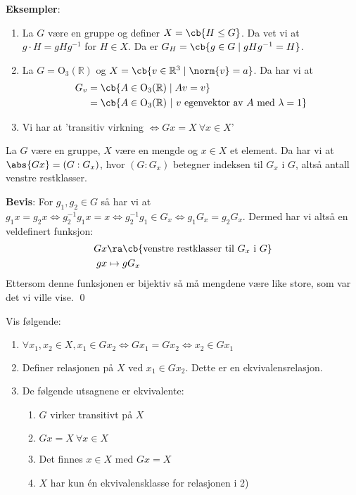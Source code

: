 \textbf{Eksempler}:
\begin{enumerate}
	\item La $G$ være en gruppe og definer $X = \cb{H \leq G}$. Da vet vi at $g\cdot H = gHg^{-1}$
	      for $H\in X$. Da er $G_H = \cb{g\in G\mid gHg^{-1} = H}$.
	\item La $G = \text{O}_3(\mathbb{R})$ og $X = \cb{v\in \mathbb{R}^3\mid \norm{v} = a}$. Da har
	      vi at
	      \begin{align}
		      G_v & = \cb{A\in \text{O}_3(\mathbb{R})\mid Av = v} \\
		          & = \cb{A\in\text{O}_3(\mathbb{R})\
			      |\ v \text{ egenvektor av }A\text{ med }\lambda=1}
	      \end{align}
	\item Vi har at 'transitiv virkning $\iff Gx=X\ \forall x\in X$'
\end{enumerate}

\begin{theorem*}{16.16}{}
	La $G$ være en gruppe, $X$ være en mengde og $x\in X$ et element. Da har vi at
	$\abs{Gx} = (G:G_x)$, hvor $(G:G_x)$ betegner indeksen til $G_x$ i $G$, altså antall venstre
	restklasser.
\end{theorem*}
\textbf{Bevis}:
For $g_1, g_2\in G$ så har vi at 
$g_1x = g_2x \iff g_2^{-1}g_1x = x \iff g_2^{-1}g_1\in G_x \iff g_1G_x = g_2G_x$. Dermed har vi
altså en veldefinert funksjon:
\begin{align}
  Gx &\ra \cb{\text{venstre restklasser til }G_x\text{ i }G} \\
  gx &\mapsto gG_x
\end{align}
Ettersom denne funksjonen er bijektiv så må mengdene være like store, som var det vi ville 
vise. \qed

Vis følgende:
\begin{enumerate}
  \item $\forall x_1, x_2 \in X, x_1 \in Gx_2 \iff Gx_1 = Gx_2 \iff x_2 \in Gx_1$
  \item Definer relasjonen på $X$ ved $x_1 \in Gx_2$. Dette er en ekvivalensrelasjon.
  \item De følgende utsagnene er ekvivalente:
    \begin{enumerate}
      \item $G$ virker transitivt på $X$
      \item $Gx = X\ \forall x\in X$
      \item Det finnes $x\in X$ med $Gx = X$
      \item $X$ har kun én ekvivalensklasse for relasjonen i 2)
    \end{enumerate}
\end{enumerate}

